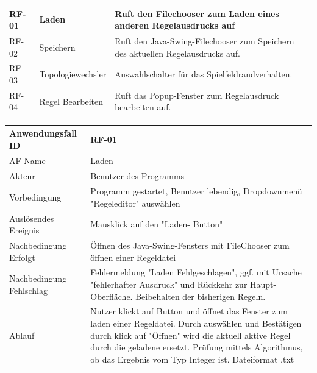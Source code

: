 \documentclass[11pt,a4paper]{article}
\begin{document}
\begin{longtable}[m]{|m{2cm}|m{4cm}|m{9cm}|} %
		\hline
		RF-01 & Laden & Ruft den Filechooser zum Laden eines anderen Regelausdrucks auf \\
		\hline
		RF-02 & Speichern & Ruft den Java-Swing-Filechooser zum Speichern des aktuellen Regelausdrucks auf. \\
		\hline
		RF-03 & Topologiewechsler & Auswahlschalter für das Spielfeldrandverhalten. \\
		\hline
		RF-04 & Regel Bearbeiten & Ruft das Popup-Fenster zum Regelausdruck bearbeiten auf. \\
		\hline
\end{longtable}
\pagebreak


     \begin{tabular}[m]{|m{7cm}|m{9cm}|}
          \hline
          Anwendungsfall ID     & RF-01 \\ %
          \hline
          AF Name     &  Laden \\
          \hline
          Akteur&Benutzer des Programms \\
          \hline
          Vorbedingung&Programm gestartet, Benutzer lebendig, Dropdownmenü "Regeleditor" auswählen\\
          \hline
          Auslösendes Ereignis&Mausklick auf den "Laden- Button"\\
          \hline
          Nachbedingung Erfolgt&Öffnen des Java-Swing-Fensters mit FileChooser zum öffnen einer Regeldatei\\
          \hline
          Nachbedingung Fehlschlag&Fehlermeldung "Laden Fehlgeschlagen", ggf. mit Ursache "fehlerhafter Ausdruck" und Rückkehr zur Haupt-Oberfläche. Beibehalten der bisherigen Regeln.\\
          \hline
          Ablauf&Nutzer klickt auf Button und öffnet das Fenster zum laden einer Regeldatei. Durch auswählen und Bestätigen durch klick auf "Öffnen" wird die aktuell aktive Regel durch die geladene ersetzt.
          Prüfung mittels Algorithmus, ob das Ergebnis vom Typ Integer ist. Dateiformat .txt\\
          \hline
     \end{tabular}
     \par
     
\end{document}
